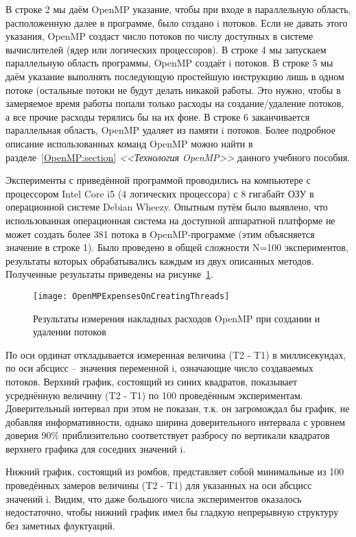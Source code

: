\inputminted{c++}{listings/OpenMPExampleTimeMeasurement.cpp}

В строке 2 мы даём OpenMP указание, чтобы при входе в параллельную область, расположенную далее в программе, было создано i потоков. Если не давать этого указания, OpenMP создаст число потоков по числу доступных в системе вычислителей (ядер или логических процессоров). В строке 4 мы запускаем параллельную область программы, OpenMP создаёт i потоков. В строке 5 мы даём указание выполнять последующую простейшую инструкцию лишь в одном потоке (остальные потоки не будут делать никакой работы. Это нужно, чтобы в замеряемое время работы попали только расходы на создание/удаление потоков, а все прочие расходы терялись бы на их фоне. В строке 6 заканчивается параллельная область, OpenMP удаляет из памяти i потоков. Более подробное описание использованных команд OpenMP можно найти в разделе~\ref{OpenMP:section} \textit{<<Технология OpenMP>>} данного учебного  пособия.

Эксперименты с приведённой программой проводились на компьютере с процессором Intel Core i5 (4 логических процессора) с 8 гигабайт ОЗУ в операционной системе Debian Wheezy. Опытным путём было выявлено, что использованная операционная система на доступной аппаратной платформе не может создать более 381 потока в OpenMP-программе (этим объясняется значение в строке 1). Было проведено в общей сложности N=100 экспериментов, результаты которых обрабатывались каждым из двух описанных методов. Полученные результаты приведены на рисунке~\ref{OpenMPExpensesOnCreatingThreads:image}.

\begin{figure}[H]
    \texttt{[image: OpenMPExpensesOnCreatingThreads]}
    \caption{Результаты измерения накладных расходов OpenMP при создании и удалении потоков}
    \label{OpenMPExpensesOnCreatingThreads:image}
\end{figure} 

По оси ординат откладывается измеренная величина (T2 - T1) в миллисекундах, по оси абсцисс – значения переменной i, означающие число создаваемых потоков. Верхний график, состоящий из синих квадратов, показывает усреднённую величину (T2 - T1) по 100 проведённым экспериментам. Доверительный интервал при этом не показан, т.к. он загромождал бы график, не добавляя информативности, однако ширина доверительного интервала с уровнем доверия 90\% приблизительно соответствует разбросу по вертикали квадратов верхнего графика для соседних значений i.

Нижний график, состоящий из ромбов, представляет собой минимальные из 100 проведённых замеров величины (T2 -  T1) для указанных на оси абсцисс значений i. Видим, что даже большого числа экспериментов оказалось недостаточно, чтобы нижний график имел бы гладкую непрерывную структуру без заметных флуктуаций.
